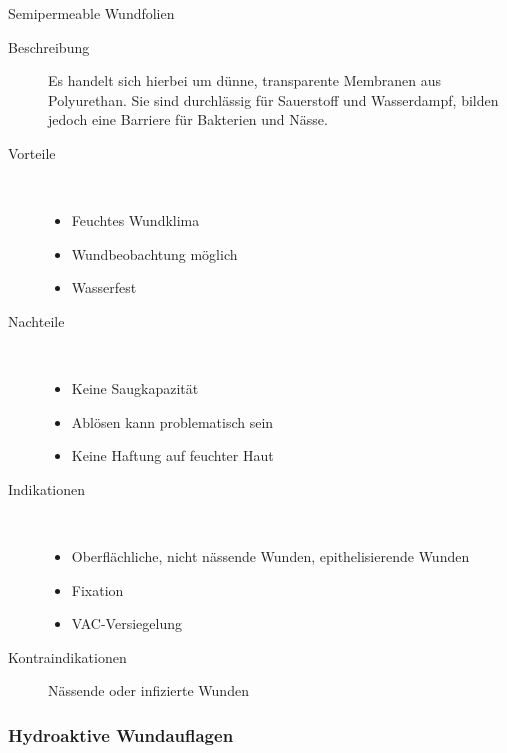 \subsubsection{}
\Text
{Semipermeable Wundfolien}
{
\begin{description}
  \item[Beschreibung] Es handelt sich hierbei um dünne,
  transparente Membranen aus Polyurethan. Sie sind
  durchlässig für Sauerstoff und Wasserdampf, bilden jedoch
  eine Barriere für Bakterien und Nässe. 
  \item[Vorteile] ~
  \begin{itemize}
    \item[$+$] Feuchtes Wundklima
    \item[$+$] Wundbeobachtung möglich
    \item[$+$] Wasserfest
  \end{itemize}
  \item[Nachteile] ~
  \begin{itemize}
    \item[$-$] Keine Saugkapazität
    \item[$-$] Ablösen kann problematisch sein
    \item[$-$] Keine Haftung auf feuchter Haut
  \end{itemize}
  \item[Indikationen]~
  \begin{itemize}
    \item Oberflächliche, nicht nässende Wunden,
    epithelisierende Wunden
    \item Fixation
    \item VAC-Versiegelung
  \end{itemize}
  \item[Kontraindikationen] Nässende oder infizierte Wunden
\end{description}
}
{}
{}
{}
{}

\subsubsection{Hydroaktive Wundauflagen}


